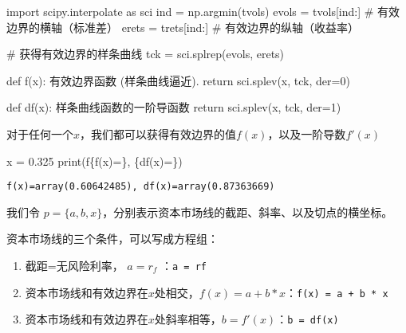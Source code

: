 \documentclass[
  letterpaper,
  DIV=11,
  numbers=noendperiod]{scrreprt}
\newenvironment{Shaded}{\begin{snugshade}}{\end{snugshade}}
\newcommand{\BuiltInTok}[1]{\textcolor[rgb]{0.00,0.23,0.31}{#1}}
\newcommand{\CommentTok}[1]{\textcolor[rgb]{0.37,0.37,0.37}{#1}}
\newcommand{\ControlFlowTok}[1]{\textcolor[rgb]{0.00,0.23,0.31}{#1}}
\newcommand{\DecValTok}[1]{\textcolor[rgb]{0.68,0.00,0.00}{#1}}
\newcommand{\FloatTok}[1]{\textcolor[rgb]{0.68,0.00,0.00}{#1}}
\newcommand{\ImportTok}[1]{\textcolor[rgb]{0.00,0.46,0.62}{#1}}
\newcommand{\KeywordTok}[1]{\textcolor[rgb]{0.00,0.23,0.31}{#1}}
\newcommand{\NormalTok}[1]{\textcolor[rgb]{0.00,0.23,0.31}{#1}}
\newcommand{\OperatorTok}[1]{\textcolor[rgb]{0.37,0.37,0.37}{#1}}
\newcommand{\SpecialCharTok}[1]{\textcolor[rgb]{0.37,0.37,0.37}{#1}}
\newcommand{\SpecialStringTok}[1]{\textcolor[rgb]{0.13,0.47,0.30}{#1}}
\providecommand{\tightlist}{%
  \setlength{\itemsep}{0pt}\setlength{\parskip}{0pt}}\usepackage{longtable,booktabs,array}
\begin{document}
\begin{Shaded}
\begin{Highlighting}[]
\ImportTok{import}\NormalTok{ scipy.interpolate }\ImportTok{as}\NormalTok{ sci}
\NormalTok{ind }\OperatorTok{=}\NormalTok{ np.argmin(tvols)}
\NormalTok{evols }\OperatorTok{=}\NormalTok{ tvols[ind:] }\CommentTok{\# 有效边界的横轴（标准差）}
\NormalTok{erets }\OperatorTok{=}\NormalTok{ trets[ind:] }\CommentTok{\# 有效边界的纵轴（收益率）}

\CommentTok{\# 获得有效边界的样条曲线}
\NormalTok{tck }\OperatorTok{=}\NormalTok{ sci.splrep(evols, erets)}


\KeywordTok{def}\NormalTok{ f(x):}
    \CommentTok{\textquotesingle{}\textquotesingle{}\textquotesingle{} 有效边界函数 (样条曲线逼近). \textquotesingle{}\textquotesingle{}\textquotesingle{}}
    \ControlFlowTok{return}\NormalTok{ sci.splev(x, tck, der}\OperatorTok{=}\DecValTok{0}\NormalTok{)}


\KeywordTok{def}\NormalTok{ df(x):}
    \CommentTok{\textquotesingle{}\textquotesingle{}\textquotesingle{} 样条曲线函数的一阶导函数 \textquotesingle{}\textquotesingle{}\textquotesingle{}}
    \ControlFlowTok{return}\NormalTok{ sci.splev(x, tck, der}\OperatorTok{=}\DecValTok{1}\NormalTok{)}
\end{Highlighting}
\end{Shaded}

对于任何一个\(x\)，我们都可以获得有效边界的值\(f(x)\)，以及一阶导数\(f'(x)\)

\begin{Shaded}
\begin{Highlighting}[]
\NormalTok{x }\OperatorTok{=} \FloatTok{0.325}
\BuiltInTok{print}\NormalTok{(}\SpecialStringTok{f\textquotesingle{}}\SpecialCharTok{\{}\NormalTok{f(x)}\OperatorTok{=}\SpecialCharTok{\}}\SpecialStringTok{, }\SpecialCharTok{\{}\NormalTok{df(x)}\OperatorTok{=}\SpecialCharTok{\}}\SpecialStringTok{\textquotesingle{}}\NormalTok{)}
\end{Highlighting}
\end{Shaded}

\begin{verbatim}
f(x)=array(0.60642485), df(x)=array(0.87363669)
\end{verbatim}

我们令
\(p = \{a,b,x\}\)，分别表示资本市场线的截距、斜率、以及切点的横坐标。

资本市场线的三个条件，可以写成方程组：

\begin{enumerate}
\def\labelenumi{\arabic{enumi}.}
\tightlist
\item
  截距=无风险利率， \(a = r_f\) ：\texttt{a\ =\ rf}
\item
  资本市场线和有效边界在\(x\)处相交，\(f(x) = a + b*x\)：\texttt{f(x)\ =\ a\ +\ b\ *\ x}
\item
  资本市场线和有效边界在\(x\)处斜率相等，\(b = f'(x)\)：\texttt{b\ =\ df(x)}
\end{enumerate}
\end{document}

